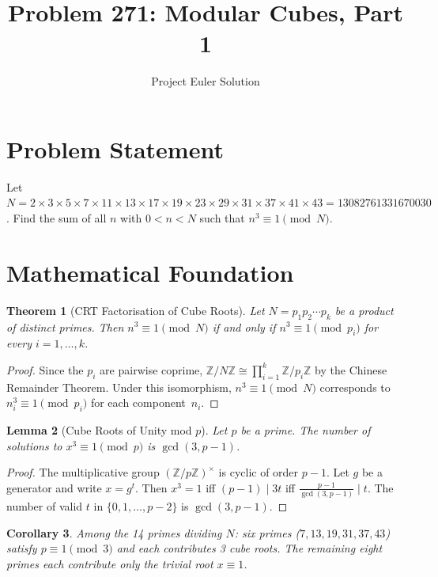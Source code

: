\documentclass[12pt]{article}
\title{Problem 271: Modular Cubes, Part 1}
\author{Project Euler Solution}
\date{}
\newtheorem{theorem}{Theorem}
\newtheorem{lemma}[theorem]{Lemma}
\newtheorem{corollary}[theorem]{Corollary}
\begin{document}
\maketitle

\section{Problem Statement}
Let $N = 2 \times 3 \times 5 \times 7 \times 11 \times 13 \times 17 \times 19 \times 23 \times 29 \times 31 \times 37 \times 41 \times 43 = 13082761331670030$. Find the sum of all $n$ with $0 < n < N$ such that $n^3 \equiv 1 \pmod{N}$.

\section{Mathematical Foundation}

\begin{theorem}[CRT Factorisation of Cube Roots]
Let $N = p_1 p_2 \cdots p_k$ be a product of distinct primes. Then $n^3 \equiv 1 \pmod{N}$ if and only if $n^3 \equiv 1 \pmod{p_i}$ for every $i = 1, \ldots, k$.
\end{theorem}

\begin{proof}
Since the $p_i$ are pairwise coprime, $\mathbb{Z}/N\mathbb{Z} \cong \prod_{i=1}^{k} \mathbb{Z}/p_i\mathbb{Z}$ by the Chinese Remainder Theorem. Under this isomorphism, $n^3 \equiv 1 \pmod{N}$ corresponds to $n_i^3 \equiv 1 \pmod{p_i}$ for each component~$n_i$.
\end{proof}

\begin{lemma}[Cube Roots of Unity mod $p$]
Let $p$ be a prime. The number of solutions to $x^3 \equiv 1 \pmod{p}$ is $\gcd(3, p-1)$.
\end{lemma}

\begin{proof}
The multiplicative group $(\mathbb{Z}/p\mathbb{Z})^\times$ is cyclic of order $p-1$. Let $g$ be a generator and write $x = g^t$. Then $x^3 = 1$ iff $(p-1) \mid 3t$ iff $\frac{p-1}{\gcd(3,p-1)} \mid t$. The number of valid $t$ in $\{0, 1, \ldots, p-2\}$ is $\gcd(3, p-1)$.
\end{proof}

\begin{corollary}
Among the 14 primes dividing $N$: six primes ($7, 13, 19, 31, 37, 43$) satisfy $p \equiv 1 \pmod{3}$ and each contributes 3 cube roots. The remaining eight primes each contribute only the trivial root $x \equiv 1$.
\end{corollary}
\end{document}
